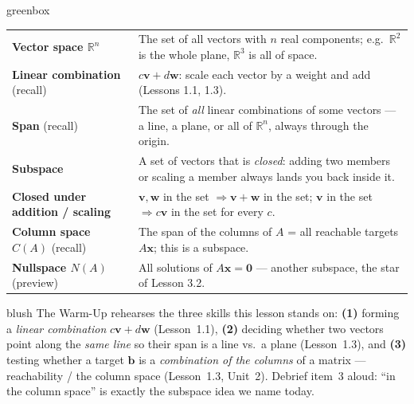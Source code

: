 \documentclass[10pt]{article}
\newcommand{\vv}{\mathbf{v}}
\newcommand{\ww}{\mathbf{w}}
\newcommand{\zero}{\mathbf{0}}
\begin{document}
\begin{skillbox}{greenbox}
\renewcommand{\arraystretch}{1.3}
\begin{tabularx}{\linewidth}{@{}l X@{}}
\textbf{Vector space $\mathbb{R}^n$} & The set of all vectors with $n$ real components; e.g.\ $\mathbb{R}^2$ is the whole plane, $\mathbb{R}^3$ is all of space. \\
\textbf{Linear combination} (recall) & $c\vv+d\ww$: scale each vector by a weight and add (Lessons 1.1, 1.3). \\
\textbf{Span} (recall) & The set of \emph{all} linear combinations of some vectors --- a line, a plane, or all of $\mathbb{R}^n$, always through the origin. \\
\textbf{Subspace} & A set of vectors that is \emph{closed}: adding two members or scaling a member always lands you back inside it. \\
\textbf{Closed under addition / scaling} & $\vv,\ww$ in the set $\Rightarrow \vv+\ww$ in the set; $\vv$ in the set $\Rightarrow c\vv$ in the set for every $c$. \\
\textbf{Column space $C(A)$} (recall) & The span of the columns of $A$ = all reachable targets $A\mathbf x$; this is a subspace. \\
\textbf{Nullspace $N(A)$} (preview) & All solutions of $A\mathbf x=\zero$ --- another subspace, the star of Lesson 3.2. \\
\end{tabularx}
\end{skillbox}

\begin{fixedskillbox}{blush}
    The Warm-Up rehearses the three skills this lesson stands on:
    \textbf{(1)} forming a \emph{linear combination} $c\vv+d\ww$ (Lesson~1.1),
    \textbf{(2)} deciding whether two vectors point along the \emph{same line} so their span is a
    line vs.\ a plane (Lesson~1.3), and
    \textbf{(3)} testing whether a target $\mathbf b$ is a \emph{combination of the columns} of a
    matrix --- reachability / the column space (Lesson~1.3, Unit~2). Debrief item~3 aloud: ``in
    the column space'' is exactly the subspace idea we name today.
\end{fixedskillbox}
\end{document}
